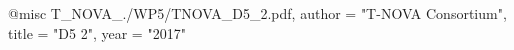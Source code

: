 @misc{ T_NOVA_./WP5/TNOVA_D5_2.pdf,
       author = "T-NOVA Consortium",
       title = "D5 2",
       year = "2017" }
